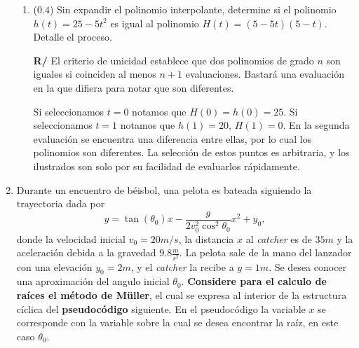 \documentclass[12pt]{article}
\begin{document}
\begin{enumerate}[leftmargin=*,widest=9]
\begin{enumerate}[label=\alph*]
    \item (\(0.4\)) Sin expandir el polinomio interpolante, determine si el polinomio \(h(t) = 25 - 5 t^2\) es igual al polinomio \(H(t) = (5 - 5t)(5 - t)\). Detalle el proceso.

\textbf{R/} El criterio de unicidad establece que dos polinomios de grado \(n\) son iguales si coinciden al menos \(n+1\) evaluaciones. Bastará una evaluación en la que difiera para notar que son diferentes.

Si seleccionamos \(t=0\) notamos que \(H(0) = h(0) = 25\). Si seleccionamos \(t=1\) notamos que \(h(1)= 20,\,H(1)=0\). En la segunda evaluación se encuentra una diferencia entre ellas, por lo cual los polinomios son diferentes. La selección de estos puntos es arbitraria, y los ilustrados son solo por su facilidad de evaluarlos rápidamente.

\end{enumerate} 
   \item {\small Durante un encuentro de béisbol, una pelota es bateada siguiendo la trayectoria dada por \[y=\tan(\theta_{0})x-\frac{g}{2v_{0}^{2}\cos^{2}\theta_{0}}x^{2}+y_{0},\] donde la velocidad inicial $v_{0}= 20 m/s$, la distancia $x$ al \textit{catcher} es de $35 m$ y la aceleración debida a la gravedad \(9.8 \frac{m}{s^2}\). La pelota sale de la mano del lanzador con una elevación $y_{0} = 2 m$, y el \textit{catcher} la recibe a \(y=1 m\). Se desea conocer una aproximación del angulo inicial \(\theta_0\). \textbf{Considere para el calculo de raíces el método de Müller}, el cual se expresa al interior de la estructura cíclica del \textbf{pseudocódigo} siguiente. En el pseudocódigo la variable \(x\) se corresponde con la variable sobre la cual se desea encontrar la raíz, en este caso \(\theta_0\).}
   

\end{enumerate}
\end{document}
